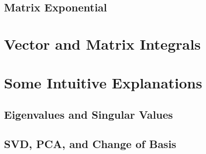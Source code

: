 \section{Matrix Exponential}




\chapter{Vector and Matrix Integrals}


\chapter{Some Intuitive Explanations}
\section{Eigenvalues and Singular Values}
\section{SVD, PCA, and Change of Basis}